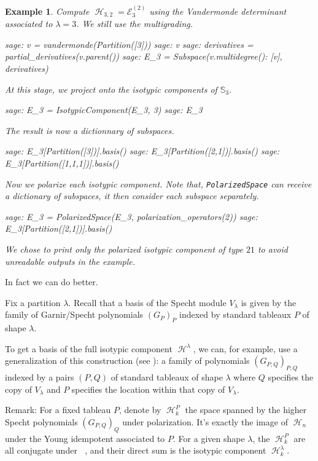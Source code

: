 \documentclass[letter,12pt]{article}
\newcommand{\Sym}[1]{\mathbb{S}_{#1}}
\DeclareMathOperator{\Sn}{\mathbb{S}_n}
\DeclareMathOperator{\harmonics}{\mathcal{H}}
\newtheorem{example}{Example}
\begin{document}
	\begin{example} \label{multigrading}
		Compute $\harmonics_{3,2} = \mathcal{E}_3^{(2)}$ using the Vandermonde determinant associated to $\lambda=3$. We still use the multigrading. 
		\begin{sagecommandline}
			sage: v = vandermonde(Partition([3]))
			sage: v
			sage: derivatives = partial_derivatives(v.parent())
			sage: E_3 = Subspace({v.multidegree(): [v]}, derivatives)
		\end{sagecommandline}
		At this stage, we project onto the isotypic components of $\Sym{3}$.
		\begin{sagecommandline}
			sage: E_3 = IsotypicComponent(E_3, 3)
			sage: E_3
		\end{sagecommandline}
		The result is now a dictionnary of subspaces.
		\begin{sagecommandline}
			sage: E_3[Partition([3])].basis()
			sage: E_3[Partition([2,1])].basis()
			sage: E_3[Partition([1,1,1])].basis()
		\end{sagecommandline}
		Now we polarize each isotypic component. Note that, \texttt{PolarizedSpace} can receive a dictionary of subspaces, it then consider each subspace separately. 
		\begin{sagecommandline}
			sage: E_3 = PolarizedSpace(E_3, polarization_operators(2))
			sage: E_3[Partition([2,1])].basis()
		\end{sagecommandline}
	We chose to print only the polarized isotypic component of type $21$ to avoid unreadable outputs in the example. 	
	\end{example}
		
	In fact we can do better.
	
	Fix a partition $\lambda$. Recall that a basis of the Specht module $V_\lambda$ is given by the family of Garnir/Specht polynomials $(G_{P})_P$ indexed by standard tableaux $P$ of shape $\lambda$.
	
	To get a basis of the full isotypic component $\harmonics^\lambda$, we can, for example, use a generalization of this construction (see \cite{Ariki1997}): a family of polynomials $(G_{P,Q})_{P,Q}$ indexed by a pairs $(P,Q)$ of standard tableaux of shape $\lambda$ where $Q$ specifies the copy of $V_\lambda$ and $P$ specifies the location within that copy of $V_\lambda$.
	
	
	Remark: For a fixed tableau $P$, denote by $\harmonics_k^P$ the space spanned by the higher Specht polynomials $(G_{P,Q})_Q$ under polarization. It's exactly the image of $\harmonics_n$ under the Young idempotent associated to $P$. For a given shape $\lambda$, the $\harmonics_k^P$ are all conjugate under $\Sn$, and their direct sum is the isotypic component $\harmonics_k^\lambda$.
	
\end{document}
